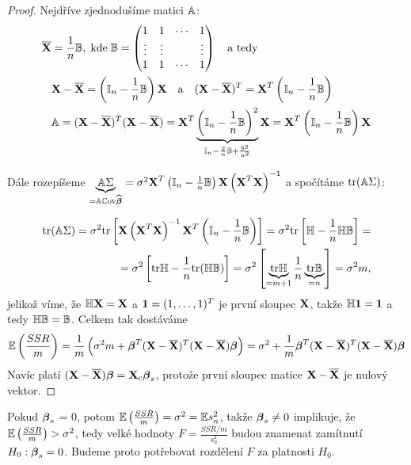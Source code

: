 \begin{proof}
Nejdříve zjednodušíme matici $\mathbb{A}$:
\begin{align*}
	\overline{\textbf{X}} & = \frac{1}{n} \mathbb{B}, \; \text{kde} \; \mathbb{B} = \begin{pmatrix}
	1 & 1 & \cdots & 1 \\
	\vdots & \vdots & & \vdots \\
	1 & 1 & \cdots & 1
	\end{pmatrix} \quad \text{a tedy} \\
	& \textbf{X} - \overline{\textbf{X}} = \left(\mathbb{I}_{n} - \frac{1}{n} \mathbb{B} \right) \textbf{X} \quad \text{a} \quad (\textbf{X} - \overline{\textbf{X}})^T = \textbf{X}^T \left(\mathbb{I}_{n} - \frac{1}{n} \mathbb{B} \right) \\
	& \mathbb{A} = (\textbf{X} - \overline{\textbf{X}})^T(\textbf{X} - \overline{\textbf{X}}) = \textbf{X}^T \underbrace{\left(\mathbb{I}_{n} - \frac{1}{n} \mathbb{B} \right)^2}_{\mathbb{I}_{n} - \frac{2}{n} \mathbb{B} + \frac{\mathbb{B}^2}{n^2}} \textbf{X} = \textbf{X}^T \left(\mathbb{I}_{n} - \frac{1}{n} \mathbb{B} \right) \textbf{X}
\end{align*}

Dále rozepíšeme $\underbrace{\mathbb{A} \Sigma}_{ = \mathbb{A} \mathbb{C}\mathrm{ov} \widehat{\boldsymbol{\beta}}} = \sigma^2 \textbf{X}^T \left( \mathbb{I}_{n} - \frac{1}{n} \mathbb{B} \right) \textbf{X} \left( \textbf{X}^T \textbf{X} \right)^{-1}$ a spočítáme $\text{tr} (\mathbb{A} \Sigma)$:

\begin{equation*}
\begin{split}
\text{tr} (\mathbb{A} \Sigma) = \sigma^2 \text{tr} \left[ \textbf{X} \left( \textbf{X}^T \textbf{X} \right)^{-1} \textbf{X}^T \left( \mathbb{I}_{n} - \frac{1}{n} \mathbb{B} \right) \right] = \sigma^2 \text{tr}\left[ \mathbb{H} - \frac{1}{n} \mathbb{H} \mathbb{B} \right] = \\ = \sigma^2 \left[ \text{tr} \mathbb{H} - \frac{1}{n} \text{tr} (\mathbb{H} \mathbb{B}) \right] = \sigma^2 \left[ \underbrace{\text{tr} \mathbb{H}}_{=m+1} \frac{1}{n} \underbrace{\text{tr} \mathbb{B}}_{= n} \right] = \sigma^2 m,
\end{split}
\end{equation*}
jelikož víme, že $\mathbb{H} \textbf{X} = \textbf{X}$ a $\mathbf{1} = (1, \dots, 1)^T$ je první sloupec $\textbf{X}$, takže $\mathbb{H} \mathbf{1} = \mathbf{1}$ a tedy $\mathbb{H} \mathbb{B} = \mathbb{B}$. Celkem tak dostáváme
$$
\mathbb{E} \left( \frac{SSR}{m} \right) = \frac{1}{m} \left( \sigma^2 m + \boldsymbol{\beta}^T (\textbf{X} - \overline{\textbf{X}})^T(\textbf{X} - \overline{\textbf{X}}) \boldsymbol{\beta} \right) = \sigma^2 + \frac{1}{m} \boldsymbol{\beta}^T (\textbf{X} - \overline{\textbf{X}})^T(\textbf{X} - \overline{\textbf{X}}) \boldsymbol{\beta}
$$
Navíc platí $(\textbf{X} - \overline{\textbf{X}}) \boldsymbol{\beta} = \textbf{X}_c \boldsymbol{\beta}_s$, protože první sloupec matice $\textbf{X} - \overline{\textbf{X}}$ je nulový vektor.
\end{proof}

\begin{remark}
Pokud $\boldsymbol{\beta}_s$ = 0, potom $\mathbb{E} \left( \frac{SSR}{m} \right) = \sigma^2 = \mathbb{E} s_n^2$, takže $\boldsymbol{\beta}_s \neq 0$ implikuje, že $\mathbb{E} \left( \frac{SSR}{m} \right) > \sigma^2$, tedy velké hodnoty $F = \frac{SSR/m}{s_n^2}$ budou znamenat zamítnutí $H_0: \boldsymbol{\beta}_s = 0$. Budeme proto potřebovat rozdělení $F$ za platnosti $H_0$.
\end{remark}

